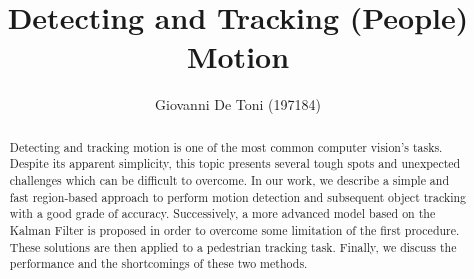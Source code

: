 \documentclass[runningheads]{llncs}
\begin{document}
%
\title{Detecting and Tracking (People) Motion}
%
%
\author{Giovanni De Toni (197184)}
%
%
%
\maketitle              %
%
\begin{abstract}
Detecting and tracking motion is one of the most common computer vision's tasks. Despite its apparent simplicity, this topic presents several tough spots and unexpected challenges which can be difficult to overcome. In our work, we describe a simple and fast region-based approach to perform motion detection and subsequent object tracking with a good grade of accuracy. Successively, a more advanced model based on the Kalman Filter is proposed in order to overcome some limitation of the first procedure. These solutions are then applied to a pedestrian tracking task. Finally, we discuss the performance and the shortcomings of these two methods.

\end{abstract}
%
%
%
\end{document}
